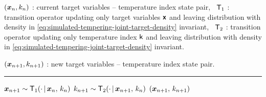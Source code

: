 \begin{algorithmic}
\small
    \Require
    $(\boldsymbol{x}_n, k_n)$ : current target variables -- temperature index state pair,~
    $\mathsf{T}_1$ : transition operator updating only target variables $\boldsymbol{\mathsf{x}}$ and leaving distribution with density in \eqref{eq:simulated-tempering-joint-target-density} invariant,~
    $\mathsf{T}_2$ : transition operator updating only temperature index $\mathsf{k}$ and leaving distribution with density in \eqref{eq:simulated-tempering-joint-target-density} invariant.
    \Ensure\raggedright
    $(\boldsymbol{x}_{n+1}, k_{n+1})$ : new target variables -- temperature index state pair.
\end{algorithmic}
\hrule
\small
\begin{algorithmic}[1]
  \State $\boldsymbol{x}_{n+1} \sim \mathsf{T}_1(\cdot \operatorname{|} \boldsymbol{x}_n,\,k_n)$
  \State $k_{n+1} \sim \mathsf{T}_2(\cdot \operatorname{|} \boldsymbol{x}_{n+1},\,k_{n})$
  \State \Return $(\boldsymbol{x}_{n+1},\, k_{n+1})$
\end{algorithmic}